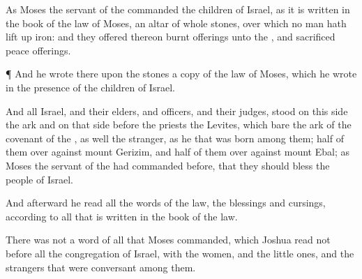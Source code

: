 {As
Moses the
servant of the
{}
commanded the
children of
Israel, as it is
written in the
book of the
law of
Moses, an
altar of
whole
stones, over which no man hath lift
up
{}
iron: and they
offered thereon burnt
offerings unto the
{}, and
sacrificed peace
offerings.


\par }{\PP {}¶ And he
wrote there upon the
stones a
copy of the
law of
Moses, which he
wrote in the
presence of the
children of
Israel.

And all
Israel, and their
elders, and
officers, and their
judges,
stood on this side the
ark and on that side before the
priests the
Levites, which
bare the
ark of the
covenant of the
{}, as well the
stranger, as he that was
born among them;
half of them
over
against
mount
Gerizim, and
half of them over
against
mount
Ebal; as
Moses the
servant of the
{} had
commanded
before, that they should
bless the
people of
Israel.

And
afterward he
read all the
words of the
law, the
blessings and
cursings, according to all that is
written in the
book of the
law.

There was not a
word of all that
Moses
commanded, which
Joshua
read not before all the
congregation of
Israel, with the
women, and the little
ones, and the
strangers that were
conversant
among them.




\par }
